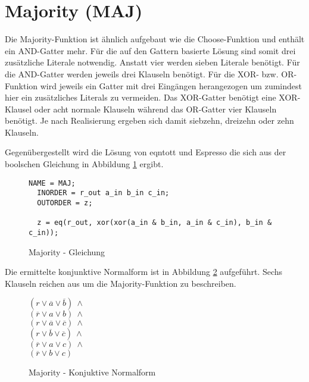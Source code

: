 \section{Majority (MAJ)}
\label{sec:knf:maj}

Die Majority-Funktion ist ähnlich aufgebaut wie die Choose-Funktion und enthält ein AND-Gatter mehr. Für die auf den Gattern basierte Lösung sind somit drei zusätzliche
Literale notwendig. Anstatt vier werden sieben Literale benötigt. Für die AND-Gatter werden jeweils drei Klauseln benötigt. Für die XOR- bzw. OR-Funktion wird jeweils
ein Gatter mit drei Eingängen herangezogen um zumindest hier ein zusätzliches Literals zu vermeiden. Das XOR-Gatter benötigt eine XOR-Klausel oder acht normale Klauseln
während das OR-Gatter vier Klauseln benötigt. Je nach Realisierung ergeben sich damit siebzehn, dreizehn oder zehn Klauseln.

Gegenübergestellt wird die Lösung von eqntott und Espresso die sich aus der boolschen Gleichung in Abbildung \ref{fig:majority_eqn} ergibt.
\begin{figure}[!h]
  \centering
  \begin{lstlisting}[]
  NAME = MAJ;
  INORDER = r_out a_in b_in c_in;
  OUTORDER = z;

  z = eq(r_out, xor(xor(a_in & b_in, a_in & c_in), b_in & c_in));
  \end{lstlisting}
  \caption{Majority - Gleichung}
  \label{fig:majority_eqn}
\end{figure}

Die ermittelte konjunktive Normalform ist in Abbildung \ref{fig:majority_cnf} aufgeführt.
Sechs Klauseln reichen aus um die Majority-Funktion zu beschreiben.
\begin{figure}[!h]
  \centering
  \begin{minipage}[l]{2cm}
    $ (r \vee \overline{a} \vee \overline{b}) ~ \wedge $\\
    $ (\overline{r} \vee a \vee b) ~ \wedge $\\
    $ (r \vee \overline{a} \vee \overline{c}) ~ \wedge $\\
    $ (r \vee \overline{b} \vee \overline{c}) ~ \wedge $\\
    $ (\overline{r} \vee a \vee c) ~ \wedge $\\
    $ (\overline{r} \vee b \vee c) $
  \end{minipage}
  \caption{Majority - Konjuktive Normalform}
  \label{fig:majority_cnf}
\end{figure}

